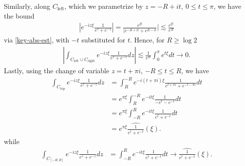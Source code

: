 \documentclass[12pt,reqno]{amsart}
\numberwithin{equation}{section}  %
\newcommand{\wh}{\widehat}
\begin{document}
        Similarly, along $C_{\text{left}}$, which we parametrize by $z = -R +
        it, \ 0 \le t \le \pi$, we have the bound
        \begin{equation*}
        \begin{split}
          | e^{-iz \xi} \frac{1}{e^{z} + e^{-z}} | = \frac{e^{\xi t}}{| e^{-R + it} +
          e^{R -it}}| \lesssim \frac{e^{\xi t}}{e^{R}}
        \end{split}
        \end{equation*}
        via \eqref{key-abs-est}, with $-t$ substituted for $t$. 
        Hence, for $R \ge \log 2$
        \begin{equation}
          \label{right-decay}
        \begin{split}
          | \int_{C_{\text{left}} \cup C_{\text{right}}}
          e^{-iz \xi} \frac{1}{e^{z} + e^{-z}} dz |
        \lesssim \frac{1}{e^{R}} \int_{0}^{\pi} e^{t \xi} dt \to 0.
     \end{split}
   \end{equation}
        Lastly, using the change of variable $z = t + \pi i$, $-R \le t \le R$,
        we have
        \begin{equation}
          \label{top-exp}
        \begin{split}
          \int_{C_{\text{top}}}e^{-iz \xi} \frac{1}{e^{z} + e^{-z}} dz
          & = \int_{R}^{-R} e^{-i(t + \pi i)\xi} 
          \frac{1}{e^{t + \pi i} + e^{-t - \pi i}} dt
          \\
          & = e^{ \pi \xi}  \int_{R}^{-R} e^{-it \xi} \frac{1}{-e^{t} -
          e^{-t}} dt
          \\
          & = e^{ \pi \xi}  \int_{-R}^{R} e^{-it \xi} \frac{1}{e^{t} +
          e^{-t}} dt
          \\
          & = e^{ \pi \xi} \wh{\frac{1}{e^{t} + e^{-t}}}(\xi).
        \end{split}
        \end{equation}
        while
        \begin{equation*}
        \begin{split}
          \int_{C_{[-R, R]}}e^{-iz \xi} \frac{1}{e^{z} + e^{-z}} dz
        & = \int_{-R}^{R}e^{-it \xi} \frac{1}{e^{t} + e^{-t}} dt
        \to \wh{ \frac{1}{e^{t} + e^{-t}}}(\xi).
        \end{split}
        \end{equation*}
\end{document}
